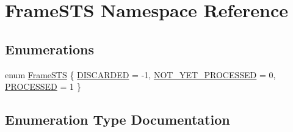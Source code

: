 \hypertarget{namespaceFrameSTS}{}\section{Frame\+S\+TS Namespace Reference}
\label{namespaceFrameSTS}
\subsection*{Enumerations}
\begin{DoxyCompactItemize}
\item 
enum \hyperlink{namespaceFrameSTS_aa00e1583f3bc837ad3fbfb9beaaa0692}{Frame\+S\+TS} \{ \hyperlink{namespaceFrameSTS_aa00e1583f3bc837ad3fbfb9beaaa0692a8608718df5a4cb285e39336cb325e5b9}{D\+I\+S\+C\+A\+R\+D\+ED} = -\/1, 
\hyperlink{namespaceFrameSTS_aa00e1583f3bc837ad3fbfb9beaaa0692a8320d47ecf7adbfb6dedd682bf1820db}{N\+O\+T\+\_\+\+Y\+E\+T\+\_\+\+P\+R\+O\+C\+E\+S\+S\+ED} = 0, 
\hyperlink{namespaceFrameSTS_aa00e1583f3bc837ad3fbfb9beaaa0692a68c0ae2c9cca0d93791d8493061f4d95}{P\+R\+O\+C\+E\+S\+S\+ED} = 1
 \}
\end{DoxyCompactItemize}


\subsection{Enumeration Type Documentation}
